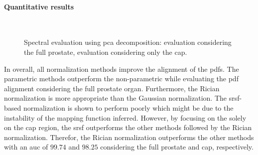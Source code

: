 \paragraph{Quantitative results}

\begin{figure}
  \centering
  \\
  \caption{Spectral evaluation using \ac{pca} decomposition: \protect{} evaluation considering the full prostate, \protect{} evaluation considering only the \ac{cap}.}
  \label{fig:qt}
\end{figure}

In overall, all normalization methods improve the alignment of the \acp{pdf}.
The parametric methods outperform the non-parametric while evaluating the \ac{pdf} alignment considering the full prostate organ.
Furthermore, the Rician normalization is more appropriate than the Gaussian normalization.
The \ac{srsf}-based normalization is shown to perform poorly which might be due to the instability of the mapping function inferred.
However, by focusing on the solely on the \ac{cap} region, the \ac{srsf} outperforms the other methods followed by the Rician normalization.
Therefor, the Rician normalization outperforms the other methods with an \ac{auc} of $99.74$ and $98.25$ considering the full prostate and \ac{cap}, respectively.

